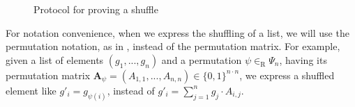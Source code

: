 \begin{figure}[h]
    \caption{Protocol for proving a shuffle}
\end{figure}


For notation convenience, when we express the shuffling of a list, we will use the permutation notation, as in \cite{Furukawa03}, instead of the permutation matrix. For example, given a list of elements \( (g_1, ..., g_n) \) and a permutation \( \psi \in_\mathrm{R} \Psi_n \), having its permutation matrix \( \boldsymbol{A}_\psi = (A_{1,1}, ..., A_{n,n}) \in \{ 0, 1 \}^{n \cdot n} \), we express a shuffled element like \( g'_i = g_{\psi(i)} \), instead of \( g'_i = \sum_{j=1}^n g_j \cdot A_{i,j} \).






